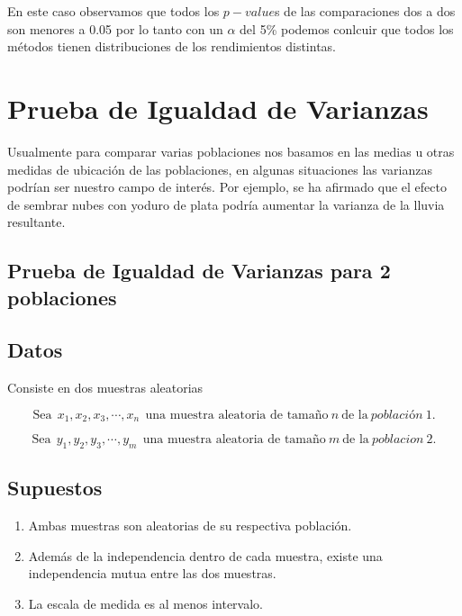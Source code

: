 \documentclass[
  a4paper,
  oneside,
  openany]{book}
\begin{document}
En este caso observamos que todos los \(p-value\)s de las comparaciones dos a dos son menores a 0.05 por lo tanto con un \(\alpha\) del 5\% podemos conlcuir que todos los métodos tienen distribuciones de los rendimientos distintas.

\hypertarget{prueba-de-igualdad-de-varianzas}{%
\chapter{Prueba de Igualdad de Varianzas}\label{prueba-de-igualdad-de-varianzas}}

Usualmente para comparar varias poblaciones nos basamos en las medias u otras medidas de ubicación de las poblaciones, en algunas situaciones las varianzas podrían ser nuestro campo de interés. Por ejemplo, se ha afirmado que el efecto de sembrar nubes con yoduro de plata podría aumentar la varianza de la lluvia resultante.

\hypertarget{prueba-de-igualdad-de-varianzas-para-2-poblaciones}{%
\section*{Prueba de Igualdad de Varianzas para 2 poblaciones}\label{prueba-de-igualdad-de-varianzas-para-2-poblaciones}}


\hypertarget{datos-8}{%
\section{Datos}\label{datos-8}}

Consiste en dos muestras aleatorias

\[\mbox{Sea} \ \ x_{1},x_{2},x_{3},\cdots,x_{n} \ \ \mbox{una muestra aleatoria de tamaño} \  n  \ \mbox{de la} \ población \ 1.\]

\[\mbox{Sea} \ \ y_{1},y_{2},y_{3},\cdots,y_{m} \ \ \mbox{una muestra aleatoria de tamaño} \ m \  \mbox{de la} \ poblacion\ 2.\]

\hypertarget{supuestos-8}{%
\section{Supuestos}\label{supuestos-8}}

\begin{enumerate}
\def\labelenumi{\arabic{enumi})}
\item
  Ambas muestras son aleatorias de su respectiva población.
\item
  Además de la independencia dentro de cada muestra, existe una independencia mutua entre las dos muestras.
\item
  La escala de medida es al menos intervalo.
\end{enumerate}
\end{document}
